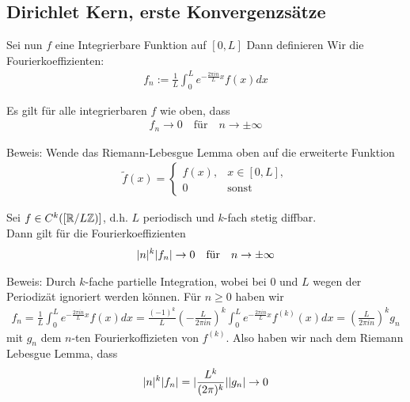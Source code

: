 
\subsection{Dirichlet Kern, erste Konvergenzsätze}

Sei nun $f$ eine Integrierbare Funktion auf $[0,L]$ Dann definieren Wir die Fourierkoeffizienten:
\begin{align*}
	f_n := \frac{1}{L}\int_{0}^{L} e^{-\frac{2\pi i n}{L}x}f(x) dx
\end{align*}


\begin{nsatz}
Es gilt für alle integrierbaren $f$ wie oben, dass 
\begin{align*}
f_n \to 0 \quad \text{für} \quad n \to \pm \infty
\end{align*}
\end{nsatz}
Beweis: Wende das Riemann-Lebesgue Lemma oben auf die erweiterte Funktion
\begin{align*}
	\tilde{f}(x) = \left\{\begin{array}{rcl}
			f(x), & x \in [0,L], \\
	    0 & \text{sonst}  
	\end{array} \right.
\end{align*}


\begin{korollar}[]
	Sei $f \in C^k([\mathbb{R}/L\mathbb{Z})]$, d.h. $L$ periodisch und $k$-fach stetig diffbar.\\
	Dann gilt für die Fourierkoeffizienten
	\begin{align*}
	\vert n\vert^k	\vert f_n\vert \to 0 \quad \text{für} \quad n \to \pm \infty
	\end{align*}
\end{korollar}
Beweis: Durch $k$-fache partielle Integration, wobei bei $0$ und $L$ wegen der Periodizät ignoriert werden können. Für $n \geq 0$ haben wir
\begin{align*}
	f_n = \frac{1}{L} \int_{0}^{L}e^{-\frac{2\pi in }{L}x}f(x) dx = \frac{(-1)^k}{L} \left(- \frac{L}{2\pi i n}\right)^k \int_{0}^{L}e^{- \frac{2\pi i n}{L}x}f^{(k)}(x) dx = \left(\frac{L}{2 \pi i n}\right)^k g_n
\end{align*}
mit $g_n$ dem $n$-ten Fourierkoffizieten von $f^{(k)}$. Also haben wir nach dem Riemann Lebesgue Lemma, dass
\begin{align*}
	\vert n\vert^k \vert f_n\vert = \vert\frac{L^k}{(2\pi)^k}\vert \vert g_n\vert \to 0
\end{align*}

